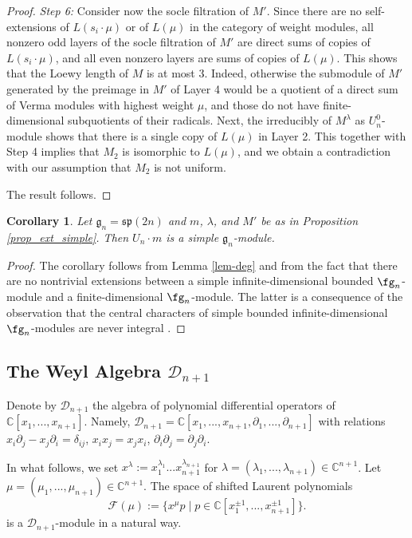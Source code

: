 \documentclass[12pt]{amsart}
\newcommand{\C}{{\mathbb C}}
\def\gg{\mathfrak{g}}
\newtheorem{cor}[thm]{Corollary}
\begin{document}
\begin{proof}
{\it Step 6: } Consider now the socle filtration of $M'$. Since there are no self-extensions of $L(s_i\cdot \mu)$ or of $L(\mu)$ in the category of weight modules, all nonzero odd layers of the socle filtration of $M'$ are direct sums of copies of $L(s_i\cdot \mu)$, and all even nonzero layers are sums of copies of $L(\mu)$. This shows that the Loewy length of $M$ is at most 3. Indeed, otherwise the submodule of $M'$ generated by the preimage in $M'$ of Layer 4 would be a quotient of a direct sum of Verma modules with highest weight $\mu$, and those do not have finite-dimensional subquotients of their radicals. Next, the irreducibly of $M^\lambda$ as $U^0_n$-module shows that there is a single copy of $L(\mu)$ in Layer 2. This together with Step 4 implies that $M_2$ is isomorphic to $L(\mu)$, and we obtain a contradiction with our assumption that $M_2$ is not uniform.

The result follows.
\end{proof}

\begin{cor} \label{cor-sp-deg1}
Let $\gg_n = \mathfrak{sp}({2n})$ and $m$, $\lambda$, and $M'$ be as in Proposition \ref{prop_ext_simple}. Then $U_n\cdot m$ is  a simple $\gg_n$-module.
\end{cor}
\begin{proof}
The corollary follows from Lemma \ref{lem-deg} and from the fact that there are no nontrivial extensions between a simple infinite-dimensional bounded $\fg_n$-module and a finite-dimensional $\fg_n$-module. The latter is a consequence of the observation that the  central characters of simple bounded infinite-dimensional $\fg_n$-modules are never integral \cite{M}.
\end{proof}

\subsection{The Weyl Algebra $\mathcal D_{n+1}$}

Denote by $\mathcal D_{n+1}$ the algebra of polynomial differential operators of ${\mathbb C}[x_1,...,x_{n+1}]$. Namely, $\mathcal D_{n+1} = {\mathbb C}[x_1,...,x_{n+1}, \partial_1,...,\partial_{n+1}]$ with relations $x_i\partial_j - x_j\partial_i = \delta_{ij}$, $x_i x_j=x_j x_i$, $\partial_i\partial_j=\partial_j\partial_i$.

In what follows, we set
$x^{\lambda} := x_1^{\lambda_1}...x_{{n+1}}^{\lambda_{{n+1}}}$ for $\lambda = (\lambda_1,...,\lambda_{{n+1}})\in{\mathbb C}^{n+1}$.
Let $\mu = (\mu_1,...,\mu_{{n+1}})\in\C^{{n+1}}$.   The space of shifted Laurent polynomials
$$
\mathcal{F}(\mu):= \{ x^{\mu} p \; | \; p \in \C [x_1^{\pm1},...,x_{{n+1}}^{\pm 1}]\}.
$$
 is a ${\mathcal D}_{n+1}$-module in a natural way.
\end{document}
